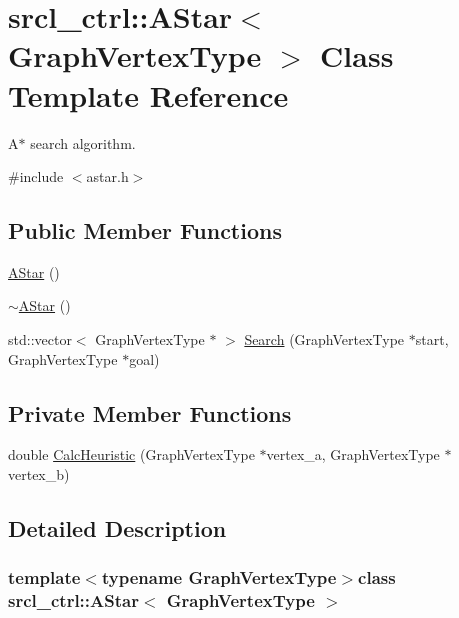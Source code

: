 \hypertarget{classsrcl__ctrl_1_1AStar}{\section{srcl\-\_\-ctrl\-:\-:A\-Star$<$ Graph\-Vertex\-Type $>$ Class Template Reference}
\label{classsrcl__ctrl_1_1AStar}
}


A$\ast$ search algorithm.  




{\ttfamily \#include $<$astar.\-h$>$}

\subsection*{Public Member Functions}
\begin{DoxyCompactItemize}
\item 
\hyperlink{classsrcl__ctrl_1_1AStar_a449cf8eefb93e6ddab1d821c52af76e2}{A\-Star} ()
\item 
\hyperlink{classsrcl__ctrl_1_1AStar_a27601d7fd7e9608a333e26e9ba31453a}{$\sim$\-A\-Star} ()
\item 
std\-::vector$<$ Graph\-Vertex\-Type $\ast$ $>$ \hyperlink{classsrcl__ctrl_1_1AStar_afe487e5443813c4a238b745bd2d73a9b}{Search} (Graph\-Vertex\-Type $\ast$start, Graph\-Vertex\-Type $\ast$goal)
\end{DoxyCompactItemize}
\subsection*{Private Member Functions}
\begin{DoxyCompactItemize}
\item 
double \hyperlink{classsrcl__ctrl_1_1AStar_a0a4b0df9a4b80bc65856e81132c179a7}{Calc\-Heuristic} (Graph\-Vertex\-Type $\ast$vertex\-\_\-a, Graph\-Vertex\-Type $\ast$vertex\-\_\-b)
\end{DoxyCompactItemize}


\subsection{Detailed Description}
\subsubsection*{template$<$typename Graph\-Vertex\-Type$>$class srcl\-\_\-ctrl\-::\-A\-Star$<$ Graph\-Vertex\-Type $>$}

